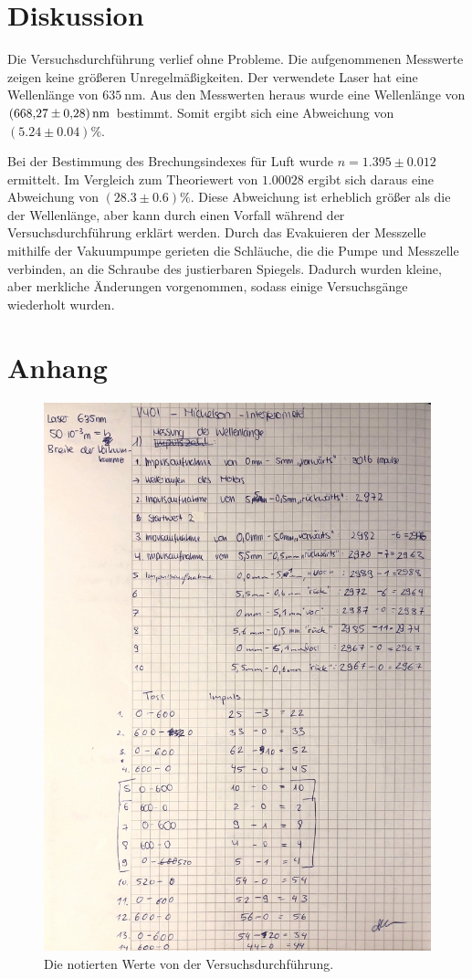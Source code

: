 \section{Diskussion}
\label{sec:Diskussion}

Die Versuchsdurchführung verlief ohne Probleme.
Die aufgenommenen Messwerte zeigen keine größeren Unregelmäßigkeiten.
Der verwendete Laser hat eine Wellenlänge von $\SI{635}{\nano\metre}$.
Aus den Messwerten heraus wurde eine Wellenlänge von $\SI{668.27 \pm 0.28}{\nano\metre}$ bestimmt.
Somit ergibt sich eine Abweichung von $(5.24 \pm 0.04) \%$.

\noindent
Bei der Bestimmung des Brechungsindexes für Luft wurde $n = 1.395 \pm 0.012$ ermittelt.
Im Vergleich zum Theoriewert von $1.00028$ \cite{brechungsindex} ergibt sich daraus eine Abweichung von $(28.3 \pm 0.6)\%$.
Diese Abweichung ist erheblich größer als die der Wellenlänge, aber kann durch einen Vorfall während der Versuchsdurchführung erklärt werden.
Durch das Evakuieren der Messzelle mithilfe der Vakuumpumpe gerieten die Schläuche, die die Pumpe und Messzelle verbinden, an die Schraube des justierbaren Spiegels.
Dadurch wurden kleine, aber merkliche Änderungen vorgenommen, sodass einige Versuchsgänge wiederholt wurden.

\section{Anhang}
\label{sec:Anhang}

\begin{figure}
    \centering
    \includegraphics[width=\textwidth]{content/data_v401.pdf}
    \caption{Die notierten Werte von der Versuchsdurchführung.}
    \label{fig:datenmessung}
\end{figure}
